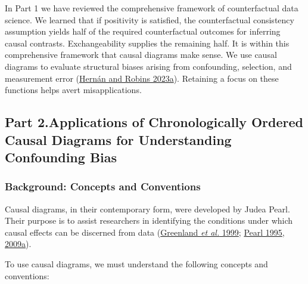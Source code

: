 \documentclass[
  singlecolumn]{article}
\begin{document}
In Part 1 we have reviewed the comprehensive framework of counterfactual
data science. We learned that if positivity is satisfied, the
counterfactual consistency assumption yields half of the required
counterfactual outcomes for inferring causal contrasts. Exchangeability
supplies the remaining half. It is within this comprehensive framework
that causal diagrams make sense. We use causal diagrams to evaluate
structural biases arising from confounding, selection, and measurement
error (\protect\hyperlink{ref-hernuxe1n2023}{Hernán and Robins 2023a}).
Retaining a focus on these functions helps avert misapplications.

\hypertarget{part-2.applications-of-chronologically-ordered-causal-diagrams-for-understanding-confounding-bias}{%
\subsection{Part 2.Applications of Chronologically Ordered Causal
Diagrams for Understanding Confounding
Bias}\label{part-2.applications-of-chronologically-ordered-causal-diagrams-for-understanding-confounding-bias}}

\hypertarget{background-concepts-and-conventions}{%
\subsubsection{Background: Concepts and
Conventions}\label{background-concepts-and-conventions}}

Causal diagrams, in their contemporary form, were developed by Judea
Pearl. Their purpose is to assist researchers in identifying the
conditions under which causal effects can be discerned from data
(\protect\hyperlink{ref-greenland1999}{Greenland \emph{et al.} 1999};
\protect\hyperlink{ref-pearl1995}{Pearl 1995},
\protect\hyperlink{ref-pearl2009}{2009a}).

To use causal diagrams, we must understand the following concepts and
conventions:
\end{document}
